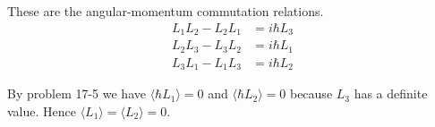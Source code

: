 


\bigskip
These are the angular-momentum commutation relations.
\begin{align*}
L_1L_2-L_2L_1&=i\hbar L_3
\\
L_2L_3-L_3L_2&=i\hbar L_1
\\
L_3L_1-L_1L_3&=i\hbar L_2
\end{align*}

By problem 17-5 we have $\langle\hbar L_1\rangle=0$
and $\langle\hbar L_2\rangle=0$ because $L_3$ has a
definite value.
Hence $\langle L_1\rangle=\langle L_2\rangle=0$.


